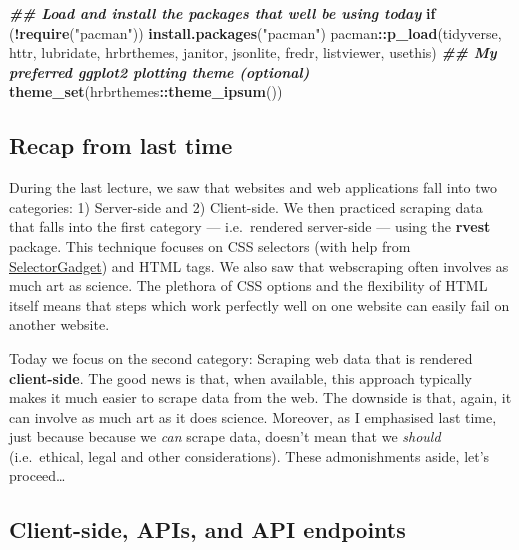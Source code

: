 \documentclass[
]{article}
\newenvironment{Shaded}{\begin{snugshade}}{\end{snugshade}}
\newcommand{\ControlFlowTok}[1]{\textcolor[rgb]{0.13,0.29,0.53}{\textbf{#1}}}
\newcommand{\DocumentationTok}[1]{\textcolor[rgb]{0.56,0.35,0.01}{\textbf{\textit{#1}}}}
\newcommand{\FunctionTok}[1]{\textcolor[rgb]{0.13,0.29,0.53}{\textbf{#1}}}
\newcommand{\NormalTok}[1]{#1}
\newcommand{\SpecialCharTok}[1]{\textcolor[rgb]{0.81,0.36,0.00}{\textbf{#1}}}
\newcommand{\StringTok}[1]{\textcolor[rgb]{0.31,0.60,0.02}{#1}}
\begin{document}
\begin{Shaded}
\begin{Highlighting}[]
\DocumentationTok{\#\# Load and install the packages that we\textquotesingle{}ll be using today}
\ControlFlowTok{if}\NormalTok{ (}\SpecialCharTok{!}\FunctionTok{require}\NormalTok{(}\StringTok{"pacman"}\NormalTok{)) }\FunctionTok{install.packages}\NormalTok{(}\StringTok{"pacman"}\NormalTok{)}
\NormalTok{pacman}\SpecialCharTok{::}\FunctionTok{p\_load}\NormalTok{(tidyverse, httr, lubridate, hrbrthemes, janitor, jsonlite, fredr, }
\NormalTok{               listviewer, usethis)}
\DocumentationTok{\#\# My preferred ggplot2 plotting theme (optional)}
\FunctionTok{theme\_set}\NormalTok{(hrbrthemes}\SpecialCharTok{::}\FunctionTok{theme\_ipsum}\NormalTok{())}
\end{Highlighting}
\end{Shaded}

\hypertarget{recap-from-last-time}{%
\subsection{Recap from last time}\label{recap-from-last-time}}

During the last lecture, we saw that websites and web applications fall
into two categories: 1) Server-side and 2) Client-side. We then
practiced scraping data that falls into the first category ---
i.e.~rendered server-side --- using the \textbf{rvest} package. This
technique focuses on CSS selectors (with help from
\href{http://selectorgadget.com/}{SelectorGadget}) and HTML tags. We
also saw that webscraping often involves as much art as science. The
plethora of CSS options and the flexibility of HTML itself means that
steps which work perfectly well on one website can easily fail on
another website.

Today we focus on the second category: Scraping web data that is
rendered \textbf{client-side}. The good news is that, when available,
this approach typically makes it much easier to scrape data from the
web. The downside is that, again, it can involve as much art as it does
science. Moreover, as I emphasised last time, just because because we
\emph{can} scrape data, doesn't mean that we \emph{should}
(i.e.~ethical, legal and other considerations). These admonishments
aside, let's proceed\ldots{}

\hypertarget{client-side-apis-and-api-endpoints}{%
\subsection{Client-side, APIs, and API
endpoints}\label{client-side-apis-and-api-endpoints}}
\end{document}
